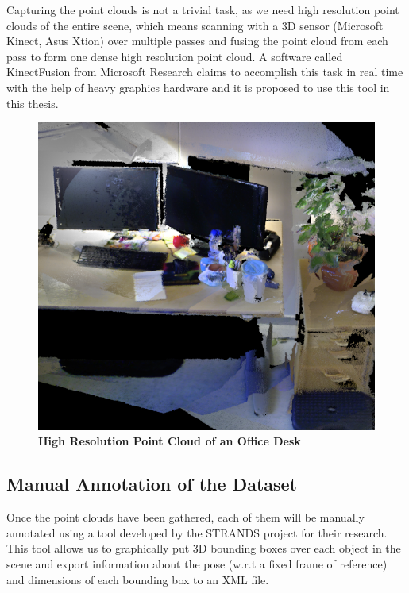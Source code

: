 \documentclass[12pt]{article}
\begin{document}
Capturing the point clouds is not a trivial task, as we need high resolution point clouds of the entire scene, which means scanning with a 3D sensor (Microsoft Kinect, Asus Xtion) over multiple passes and fusing the point cloud from each pass to form one dense high resolution point cloud. A software called KinectFusion from Microsoft Research\cite{KinectFusion} claims to accomplish this task in real time with the help of heavy graphics hardware and it is proposed to use this tool in this thesis.


\begin{figure} [H]
\includegraphics[scale = 0.25]{pcl.png}
\centering
\caption{\textbf{High Resolution Point Cloud of an Office Desk \cite{KTH Dataset}}} 
\end{figure}


\subsection{Manual Annotation of the Dataset}

Once the point clouds have been gathered, each of them will be manually annotated using a tool developed by the STRANDS project for their research. This tool allows us to graphically put 3D bounding boxes over each object in the scene and export information about the pose (w.r.t a fixed frame of reference) and dimensions of each bounding box to an XML file.
\end{document}
